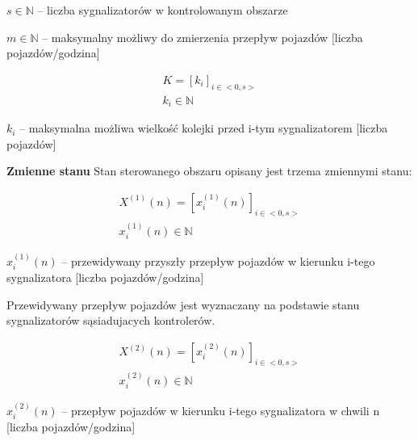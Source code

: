 \begin{math} s \in \mathbb{N} \end{math} \textrm{ -- liczba sygnalizatorów w kontrolowanym obszarze}

\begin{math} m \in \mathbb{N} \end{math} \textrm{ -- maksymalny możliwy do zmierzenia przepływ pojazdów [liczba pojazdów/godzina]}

\begin{equation}
	\begin{array}{c}
		K = \left[ k_{i} \right]_{i \in <0,s>}\\
		k_{i} \in \mathbb{N}
	\end{array}
\end{equation}

\begin{math} k_{i} \end{math} \textrm{ -- maksymalna możliwa wielkość kolejki przed i-tym sygnalizatorem [liczba pojazdów]}

\vspace{1.5cm}
\textbf{Zmienne stanu}
Stan sterowanego obszaru opisany jest trzema zmiennymi stanu:
\vspace{0.5cm}

\begin{equation}
	\begin{array}{c}
		X^{(1)} (n) = \left[ x^{(1)}_{i} (n) \right]_{i \in <0,s>}\\
		x^{(1)}_{i} (n) \in \mathbb{N}
	\end{array}
\end{equation}

\begin{math} x^{(1)}_{i} (n) \end{math} \textrm{ -- przewidywany przyszły przepływ pojazdów w kierunku i-tego sygnalizatora [liczba pojazdów/godzina]}

Przewidywany przepływ pojazdów jest wyznaczany na podstawie stanu sygnalizatorów sąsiadujacych kontrolerów.

\begin{equation}
	\begin{array}{c}
		X^{(2)} (n) = \left[ x^{(2)}_{i} (n) \right]_{i \in <0,s>}\\
		x^{(2)}_{i} (n) \in \mathbb{N}
	\end{array}
\end{equation}

\begin{math} x^{(2)}_{i} (n) \end{math} \textrm{ -- przepływ pojazdów w kierunku i-tego sygnalizatora w chwili n [liczba pojazdów/godzina]}

